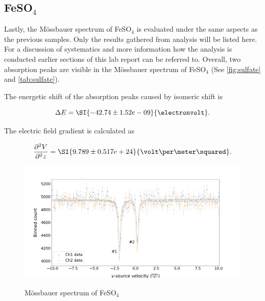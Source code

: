 
\subsection{FeSO$_4$}
\label{ssec:sulfate}

Lastly, the Mössbauer spectrum of FeSO$_4$ is evaluated under the same aspects as the
previous samples. Only the results gathered from analysis will be listed here. For a
discussion of systematics and more information how the analysis is conducted earlier
sections of this lab report can be referred to. Overall, two absorption peaks are
visible in the Mössbauer spectrum of FeSO$_4$ (See \autoref{fig:sulfate} and
\autoref{tab:sulfate}).

The energetic shift of the absorption peaks caused by isomeric shift is

\begin{equation}
\Delta E = \SI{-42.74\pm 1.52e-09}{\electronvolt}.
\end{equation}

The electric field gradient is calculated as

\begin{equation}
\frac{\partial^2 V}{\partial^2 z} = \SI{9.789\pm0.517e+24}{\volt\per\meter\squared}.
\end{equation}

\begin{figure}

	\includegraphics[width=1.0\textwidth]{./fig/Sulfate.png}
	\caption{Mössbauer spectrum of FeSO$_4$}{}
	\label{fig:sulfate}
\end{figure}


